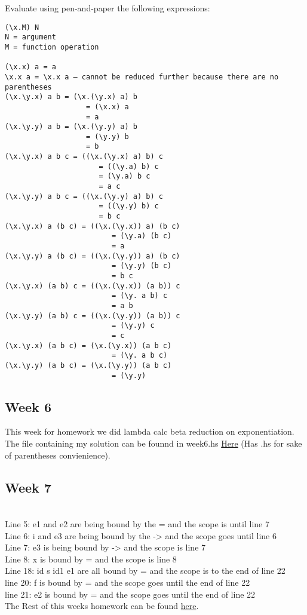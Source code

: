 \documentclass{article}
\theoremstyle{theorem}
\theoremstyle{definition}
\theoremstyle{remark}
\begin{document}
Evaluate using pen-and-paper the following expressions:
\begin{lstlisting}
(\x.M) N
N = argument
M = function operation

(\x.x) a = a
\x.x a = \x.x a — cannot be reduced further because there are no parentheses
(\x.\y.x) a b = (\x.(\y.x) a) b
                   = (\x.x) a
                   = a
(\x.\y.y) a b = (\x.(\y.y) a) b
                   = (\y.y) b
                   = b
(\x.\y.x) a b c = ((\x.(\y.x) a) b) c
                      = ((\y.a) b) c
                      = (\y.a) b c
                      = a c
(\x.\y.y) a b c = ((\x.(\y.y) a) b) c
                      = ((\y.y) b) c
                      = b c
(\x.\y.x) a (b c) = ((\x.(\y.x)) a) (b c)
                         = (\y.a) (b c)
                         = a
(\x.\y.y) a (b c) = ((\x.(\y.y)) a) (b c)
                         = (\y.y) (b c)
                         = b c
(\x.\y.x) (a b) c = ((\x.(\y.x)) (a b)) c
                         = (\y. a b) c
                         = a b
(\x.\y.y) (a b) c = ((\x.(\y.y)) (a b)) c
                         = (\y.y) c
                         = c
(\x.\y.x) (a b c) = (\x.(\y.x)) (a b c)
                         = (\y. a b c)
(\x.\y.y) (a b c) = (\x.(\y.y)) (a b c)
                         = (\y.y)
\end{lstlisting}

\subsection{Week 6}

This week for homework we did lambda calc beta reduction on exponentiation. The file containing my solution can be founnd in week6.hs \href{https://github.com/jacgoldberg/Programming-Lang/blob/main/week6.hs}{Here} (Has .hs for sake of parentheses convienience).

\subsection{Week 7}
\\Line 5: e1 and e2 are being bound by the = and the scope is until line 7
\\Line 6: i and e3 are being bound by the -> and the scope goes until line 6
\\Line 7: e3 is being bound by -> and the scope is line 7
\\Line 8: x is bound by = and the scope is line 8
\\Line 18: id s id1 e1 are all bound by = and the scope is to the end of line 22
\\line 20: f is bound by = and the scope goes until the end of line 22
\\line 21: e2 is bound by = and the scope goes until the end of line 22
\\The Rest of this weeks homework can be found \href{https://github.com/jacgoldberg/Programming-Lang/blob/main/Note%20Oct%2019%2C%202022.pdf}{here}.
\end{document}
